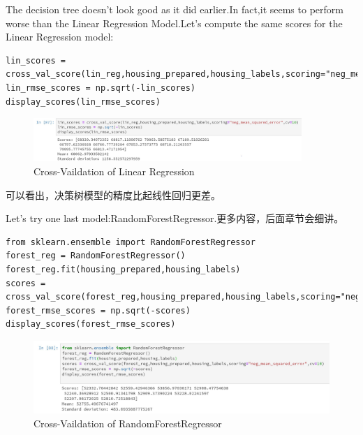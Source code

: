 \documentclass[UTF8]{ctexart}
\begin{document}
The decision tree doesn't look good as it did earlier.In fact,it seems to perform worse than the Linear Regression Model.Let's compute the same scores for the Linear Regression model:
\begin{lstlisting}
lin_scores = cross_val_score(lin_reg,housing_prepared,housing_labels,scoring="neg_mean_squared_error",cv=10)
lin_rmse_scores = np.sqrt(-lin_scores)
display_scores(lin_rmse_scores)
\end{lstlisting}

\begin{figure}[H]
\centering
\includegraphics[width = 4in]{lin_cross_val.JPG}
\caption{Cross-Vaildation of Linear Regression}
\end{figure}

可以看出，决策树模型的精度比起线性回归更差。

Let's try one last model:RandomForestRegressor.更多内容，后面章节会细讲。
\begin{lstlisting}
from sklearn.ensemble import RandomForestRegressor
forest_reg = RandomForestRegressor()
forest_reg.fit(housing_prepared,housing_labels)
scores = cross_val_score(forest_reg,housing_prepared,housing_labels,scoring="neg_mean_squared_error",cv=10)
forest_rmse_scores = np.sqrt(-scores)
display_scores(forest_rmse_scores)
\end{lstlisting}

\begin{figure}[H]
\centering
\includegraphics[width = 6in]{forest_val.JPG}
\caption{Cross-Vaildation of RandomForestRegressor}
\end{figure}
\end{document}
